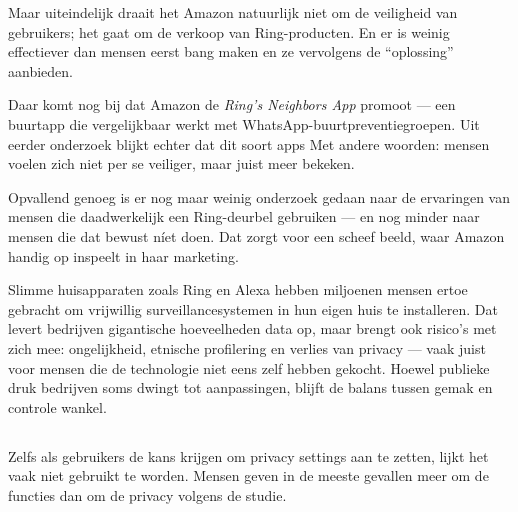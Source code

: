 \documentclass[nonacm,sigconf]{acmart}
\begin{document}
    Maar uiteindelijk draait het Amazon natuurlijk niet om de veiligheid van gebruikers; het gaat om de verkoop van Ring-producten.
    En er is weinig effectiever dan mensen eerst bang maken en ze vervolgens de “oplossing” aanbieden.

    Daar komt nog bij dat Amazon de \textit{Ring’s Neighbors App} promoot — een buurtapp die vergelijkbaar werkt met WhatsApp-buurtpreventiegroepen.
    Uit eerder onderzoek blijkt echter dat dit soort apps
    Met andere woorden: mensen voelen zich niet per se veiliger, maar juist meer bekeken.

    Opvallend genoeg is er nog maar weinig onderzoek gedaan naar de ervaringen van mensen die daadwerkelijk een Ring-deurbel gebruiken — en nog minder naar mensen die dat bewust níet doen.
    Dat zorgt voor een scheef beeld, waar Amazon handig op inspeelt in haar marketing.

    Slimme huisapparaten zoals Ring en Alexa hebben miljoenen mensen ertoe gebracht om vrijwillig surveillancesystemen in hun eigen huis te installeren.
    Dat levert bedrijven gigantische hoeveelheden data op, maar brengt ook risico’s met zich mee: ongelijkheid, etnische profilering en verlies van privacy — vaak juist voor mensen die de technologie niet eens zelf hebben gekocht. Hoewel publieke druk bedrijven soms dwingt tot aanpassingen, blijft de balans tussen gemak en controle wankel.


    \subsection{}

    \parencite{chaudhari2020smart}

    \subsection{}
    \parencite{tabassum2023exploring}
    

    Zelfs als gebruikers de kans krijgen om privacy settings aan te zetten, lijkt het vaak niet gebruikt te worden.
    Mensen geven in de meeste gevallen meer om de functies dan om de privacy volgens de studie.
\end{document}
